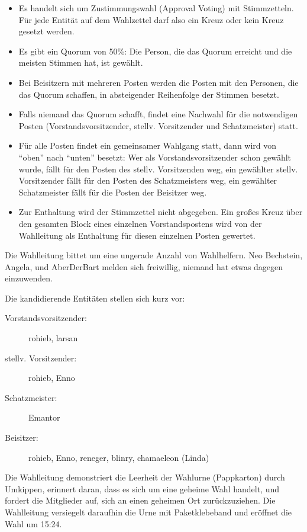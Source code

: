 \documentclass{s0minutes}
\begin{document}
\begin{itemize}
  \item Es handelt sich um Zustimmungswahl (Approval Voting) mit Stimmzetteln.
    Für jede Entität auf dem Wahlzettel darf also ein Kreuz oder kein Kreuz
    gesetzt werden.
  \item Es gibt ein Quorum von 50\%: Die Person, die das Quorum erreicht und die
    meisten Stimmen hat, ist gewählt.
  \item Bei Beisitzern mit mehreren Posten werden die Posten mit den Personen,
    die das Quorum schaffen, in absteigender Reihenfolge der Stimmen besetzt.
  \item Falls niemand das Quorum schafft, findet eine Nachwahl für die
    notwendigen Posten (Vorstandsvorsitzender, stellv. Vorsitzender und
    Schatzmeister) statt.
  \item Für alle Posten findet ein gemeinsamer Wahlgang statt, dann wird von
    "`oben"' nach "`unten"' besetzt: Wer als Vorstandsvorsitzender schon gewählt
    wurde, fällt für den Posten des stellv. Vorsitzenden weg, ein gewählter
    stellv. Vorsitzender fällt für den Posten des Schatzmeisters weg, ein
    gewählter Schatzmeister fällt für die Posten der Beisitzer weg.
  \item Zur Enthaltung wird der Stimmzettel nicht abgegeben. Ein großes Kreuz
    über den gesamten Block eines einzelnen Vorstandspostens wird von der
    Wahlleitung als Enthaltung für diesen einzelnen Posten gewertet.
\end{itemize}

Die Wahlleitung bittet um eine ungerade Anzahl von Wahlhelfern. Neo Bechstein,
Angela, und AberDerBart melden sich freiwillig, niemand hat etwas dagegen
einzuwenden.

Die kandidierende Entitäten stellen sich kurz vor:
\begin{description}
  \item[Vorstandsvorsitzender:] rohieb, larsan
  \item[stellv. Vorsitzender:] rohieb, Enno
  \item[Schatzmeister:] Emantor
  \item[Beisitzer:] rohieb, Enno, reneger, blinry, chamaeleon (Linda)
\end{description}

Die Wahlleitung demonstriert die Leerheit der Wahlurne (Pappkarton) durch
Umkippen, erinnert daran, dass es sich um eine geheime Wahl handelt, und fordert
die Mitglieder auf, sich an einen geheimen Ort zurückzuziehen. Die Wahlleitung
versiegelt daraufhin die Urne mit Paketklebeband und eröffnet die Wahl um 15:24.
\end{document}
